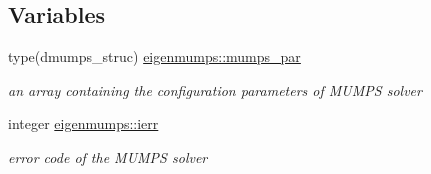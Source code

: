 \subsection*{Variables}
\begin{DoxyCompactItemize}
\item 
type(dmumps\+\_\+struc) \hyperlink{namespaceeigenmumps_a96a8141178a4cd84a24bd63b11685409}{eigenmumps\+::mumps\+\_\+par}
\begin{DoxyCompactList}\small\item\em an array containing the configuration parameters of M\+U\+M\+PS solver \end{DoxyCompactList}\item 
integer \hyperlink{namespaceeigenmumps_a0b6d919fe610b180483db0dcba47ba1c}{eigenmumps\+::ierr}
\begin{DoxyCompactList}\small\item\em error code of the M\+U\+M\+PS solver \end{DoxyCompactList}\end{DoxyCompactItemize}

